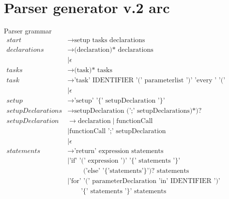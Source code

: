 \section{Parser generator v.2 arc}\label{sec:parsergeneratorarc}
Parser grammar
\begin{align*}
    start                   & \to \text{setup tasks declarations} \\
    declarations            & \to \text{(declaration)* declarations}\\
                            & \mid \epsilon \\
    tasks                   & \to \text{(task)* tasks}\\
    task                    & \to \text{'task' IDENTIFIER '(' parameterlist ')' 'every ' '(' expression ')' '\{' statements '\}'}       \\%
                            & \mid \epsilon \\
    setup                   & \to \text{'setup' '\{' setupDeclaration '\}'}                                       \\
    setupDeclarations       & \to \text{setupDeclaration (';' setupDeclarations)*)?}                              \\
    setupDeclaration        & \to \text{declaration} \mid \text{functionCall}                                     \\
                            & \mid \text{functionCall ';' setupDeclaration}                                       \\
                            & \mid \epsilon                                                                       \\
    statements              & \to \text{'return' expression statements}                                           \\
                            & \mid \text{'if' '(' expression ')' '\{' statements '\}'}                     \\
                            & \qquad \text{ ('else' '\{'statements'\}')? statements}                                         \\
                            & \mid \text{'for' '(' parameterDeclaration 'in' IDENTIFIER ')'}                      \\
                            & \qquad \text{'\{' statements '\}' statements}                                       \\

\end{align*}
